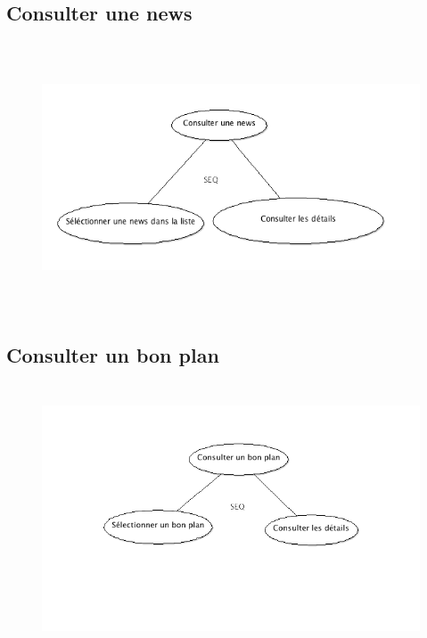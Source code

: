 \documentclass[a4paper, 11px]{article}
\begin{document}
\subsection{Consulter une news}
\vfill
\begin{figure}[h!]
\includegraphics[width=18cm,height=8cm]{consulter_news.png}
\end{figure}

\subsection{Consulter un bon plan}

\begin{figure}[h!]
\includegraphics[width=18cm,height=8cm]{consulter_bonplans.png}
\end{figure}

\vfill
\clearpage
\end{document}
